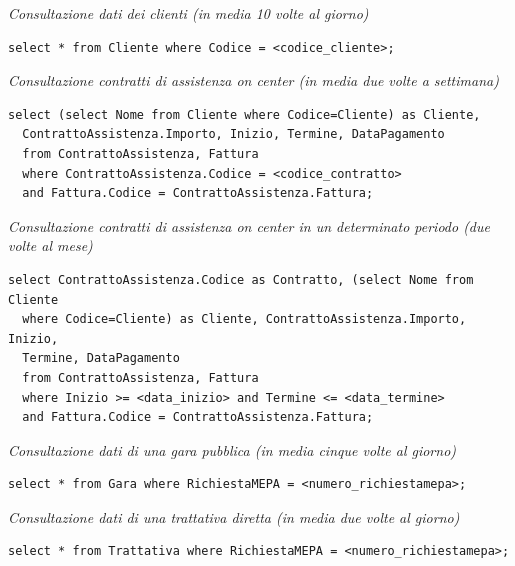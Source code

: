 \noindent\textit{Consultazione dati dei clienti (in media 10 volte al giorno)}
\begin{verbatim}
select * from Cliente where Codice = <codice_cliente>;
\end{verbatim}
\vspace{1cm}

\noindent\textit{Consultazione contratti di assistenza on center (in media due volte a settimana)}
\begin{verbatim}
select (select Nome from Cliente where Codice=Cliente) as Cliente,
  ContrattoAssistenza.Importo, Inizio, Termine, DataPagamento
  from ContrattoAssistenza, Fattura
  where ContrattoAssistenza.Codice = <codice_contratto>
  and Fattura.Codice = ContrattoAssistenza.Fattura;
\end{verbatim}
\vspace{1cm}

\noindent\textit{Consultazione contratti di assistenza on center in un determinato periodo (due volte al mese)}
\begin{verbatim}
select ContrattoAssistenza.Codice as Contratto, (select Nome from Cliente
  where Codice=Cliente) as Cliente, ContrattoAssistenza.Importo, Inizio,
  Termine, DataPagamento
  from ContrattoAssistenza, Fattura
  where Inizio >= <data_inizio> and Termine <= <data_termine>
  and Fattura.Codice = ContrattoAssistenza.Fattura;

\end{verbatim}
\vspace{0.5cm}

\noindent{}
\newline\newline

\noindent\textit{Consultazione dati di una gara pubblica (in media cinque volte al giorno)}
\begin{verbatim}
select * from Gara where RichiestaMEPA = <numero_richiestamepa>;
\end{verbatim}
\vspace{1cm}

\noindent\textit{Consultazione dati di una trattativa diretta (in media due volte al giorno)}
\begin{verbatim}
select * from Trattativa where RichiestaMEPA = <numero_richiestamepa>;
\end{verbatim}
\vspace{1cm}


